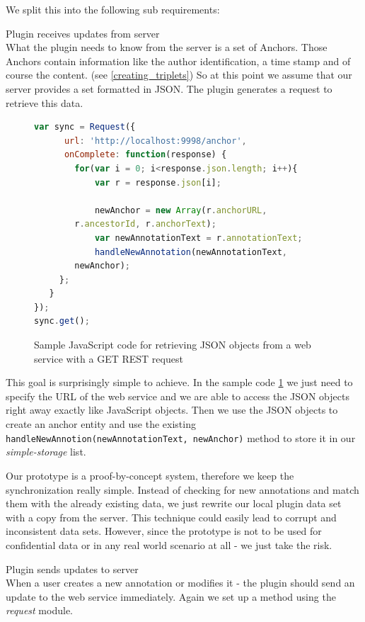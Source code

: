 We split this into the following sub requirements:
\begin{description}
\item Plugin receives updates from server\\
What the plugin needs to know from the server is a set of Anchors. Those Anchors contain information like the author identification, a time stamp and of course the content.
(see \ref{creating_triplets}) 
So at this point we assume that our server provides a set formatted in JSON. The plugin generates a request to retrieve this data. 
\begin{figure}
\begin{lstlisting}[language=JavaScript]
var sync = Request({
      url: 'http://localhost:9998/anchor',
      onComplete: function(response) {
        for(var i = 0; i<response.json.length; i++){
            var r = response.json[i];

            newAnchor = new Array(r.anchorURL, 
		r.ancestorId, r.anchorText);
            var newAnnotationText = r.annotationText;
            handleNewAnnotation(newAnnotationText, 
		newAnchor);
     };
   }
});
sync.get();
\end{lstlisting}
\label{anchor_sample_code}
\caption{Sample JavaScript code for retrieving JSON objects from a web service with a GET REST request}
\end{figure}

This goal is surprisingly simple to achieve. In the sample code \ref{anchor_sample_code} we just need to specify the URL of the web service and we are able to access the JSON objects right away exactly like JavaScript objects. Then we use the JSON objects to create an anchor entity and use the existing \verb| handleNewAnnotion(newAnnotationText, newAnchor)| method to store it in our \emph{simple-storage} list. 

Our prototype is a proof-by-concept system, therefore we keep the synchronization really simple. Instead of checking for new annotations and match them with the already existing data, we just rewrite our local plugin data set with a copy from the server. This technique could easily lead to corrupt and inconsistent data sets. However, since the prototype is not to be used for confidential data or in any real world scenario at all - we just take the risk.

\item Plugin sends updates to server\\
When a user creates a new annotation or modifies it - the plugin should send an update to the web service immediately. Again we set up a method using the \emph{request} module. 
\end{description}

